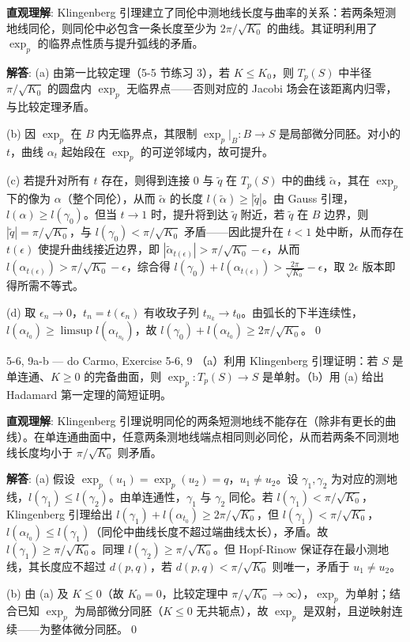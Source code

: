 \begin{solution}
\textbf{直观理解}: Klingenberg 引理建立了同伦中测地线长度与曲率的关系：若两条短测地线同伦，则同伦中必包含一条长度至少为 $2\pi/\sqrt{K_0}$ 的曲线。其证明利用了 $\exp_p$ 的临界点性质与提升弧线的矛盾。

\textbf{解答}: (a) 由第一比较定理（5-5 节练习 3），若 $K\leq K_0$，则 $T_p(S)$ 中半径 $\pi/\sqrt{K_0}$ 的圆盘内 $\exp_p$ 无临界点——否则对应的 Jacobi 场会在该距离内归零，与比较定理矛盾。

(b) 因 $\exp_p$ 在 $B$ 内无临界点，其限制 $\exp_p|_B: B\to S$ 是局部微分同胚。对小的 $t$，曲线 $\alpha_t$ 起始段在 $\exp_p$ 的可逆邻域内，故可提升。

(c) 若提升对所有 $t$ 存在，则得到连接 $0$ 与 $\tilde{q}$ 在 $T_p(S)$ 中的曲线 $\tilde{\alpha}$，其在 $\exp_p$ 下的像为 $\alpha$（整个同伦），从而 $\tilde{\alpha}$ 的长度 $l(\tilde{\alpha})\geq |\tilde{q}|$。由 Gauss 引理，$l(\alpha)\geq l(\gamma_0)$。但当 $t\to 1$ 时，提升将到达 $\tilde{q}$ 附近，若 $\tilde{q}$ 在 $B$ 边界，则 $|\tilde{q}|=\pi/\sqrt{K_0}$，与 $l(\gamma_0)<\pi/\sqrt{K_0}$ 矛盾——因此提升在 $t<1$ 处中断，从而存在 $t(\epsilon)$ 使提升曲线接近边界，即 $|\tilde{\alpha}_{t(\epsilon)}|>\pi/\sqrt{K_0}-\epsilon$，从而 $l(\alpha_{t(\epsilon)})>\pi/\sqrt{K_0}-\epsilon$，综合得 $l(\gamma_0)+l(\alpha_{t(\epsilon)})>\frac{2\pi}{\sqrt{K_0}}-\epsilon$，取 $2\epsilon$ 版本即得所需不等式。

(d) 取 $\epsilon_n\to 0$，$t_n=t(\epsilon_n)$ 有收玫子列 $t_{n_k}\to t_0$。由弧长的下半连续性，$l(\alpha_{t_0})\geq\limsup l(\alpha_{t_{n_k}})$，故 $l(\gamma_0)+l(\alpha_{t_0})\geq 2\pi/\sqrt{K_0}$。\qed
\end{solution}

\begin{exercise}{5-6, 9a-b — do Carmo, Exercise 5-6, 9}
（a）利用 Klingenberg 引理证明：若 $S$ 是单连通、$K \geq 0$ 的完备曲面，则 $\exp_p: T_p(S) \to S$ 是单射。（b）用 (a) 给出 Hadamard 第一定理的简短证明。
\end{exercise}
\begin{solution}
\textbf{直观理解}: Klingenberg 引理说明同伦的两条短测地线不能存在（除非有更长的曲线）。在单连通曲面中，任意两条测地线端点相同则必同伦，从而若两条不同测地线长度均小于 $\pi/\sqrt{K_0}$ 则矛盾。

\textbf{解答}: (a) 假设 $\exp_p(u_1)=\exp_p(u_2)=q$，$u_1\neq u_2$。设 $\gamma_1,\gamma_2$ 为对应的测地线，$l(\gamma_1)\leq l(\gamma_2)$。由单连通性，$\gamma_1$ 与 $\gamma_2$ 同伦。若 $l(\gamma_1)<\pi/\sqrt{K_0}$，Klingenberg 引理给出 $l(\gamma_1)+l(\alpha_{t_0})\geq 2\pi/\sqrt{K_0}$，但 $l(\gamma_1)<\pi/\sqrt{K_0}$，$l(\alpha_{t_0})\leq l(\gamma_1)$（同伦中曲线长度不超过端曲线太长），矛盾。故 $l(\gamma_1)\geq\pi/\sqrt{K_0}$。同理 $l(\gamma_2)\geq\pi/\sqrt{K_0}$。但 Hopf-Rinow 保证存在最小测地线，其长度应不超过 $d(p,q)$，若 $d(p,q)<\pi/\sqrt{K_0}$ 则唯一，矛盾于 $u_1\neq u_2$。

(b) 由 (a) 及 $K\leq 0$（故 $K_0=0$，比较定理中 $\pi/\sqrt{K_0}\to\infty$），$\exp_p$ 为单射；结合已知 $\exp_p$ 为局部微分同胚（$K\leq 0$ 无共轭点），故 $\exp_p$ 是双射，且逆映射连续——为整体微分同胚。\qed
\end{solution}

